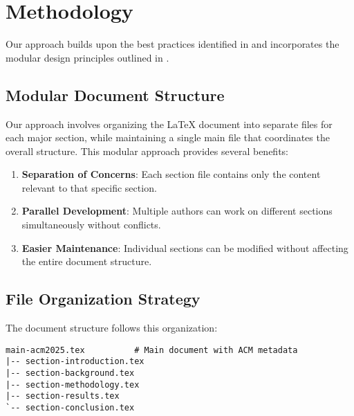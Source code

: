 
\section{Methodology}\label{sec:methodology}

Our approach builds upon the best practices identified in \cite{research2024} and incorporates the modular design principles outlined in \cite{latexguide2023}.

\subsection{Modular Document Structure}

Our approach involves organizing the LaTeX document into separate files for each major 
section, while maintaining a single main file that coordinates the overall structure. 
This modular approach provides several benefits:

\begin{enumerate}
    \item \textbf{Separation of Concerns}: Each section file contains only the content 
          relevant to that specific section.
    \item \textbf{Parallel Development}: Multiple authors can work on different sections 
          simultaneously without conflicts.
    \item \textbf{Easier Maintenance}: Individual sections can be modified without 
          affecting the entire document structure.
\end{enumerate}

\subsection{File Organization Strategy}

The document structure follows this organization:

\begin{verbatim}
main-acm2025.tex          # Main document with ACM metadata
|-- section-introduction.tex
|-- section-background.tex
|-- section-methodology.tex
|-- section-results.tex
`-- section-conclusion.tex
\end{verbatim}

